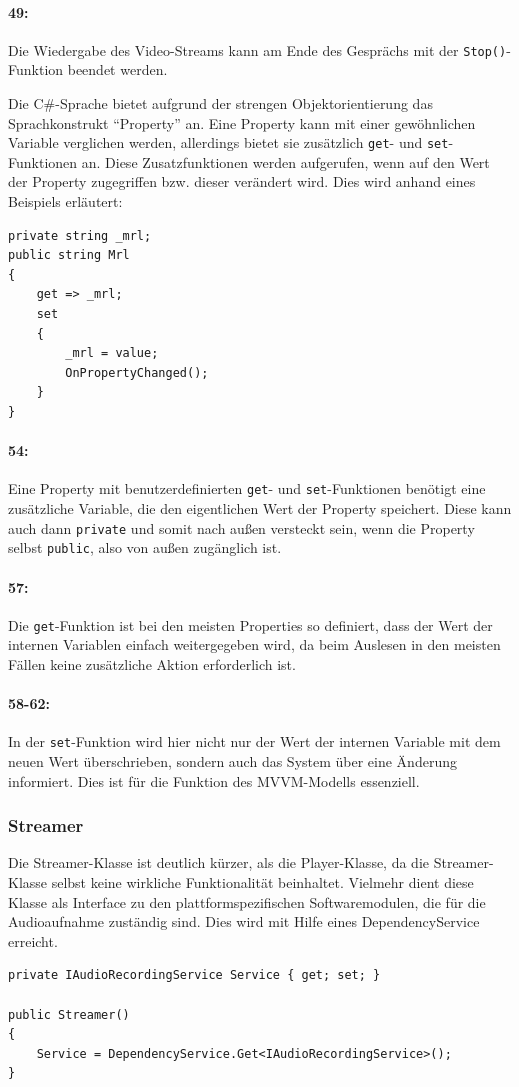 \paragraph{49:} Die Wiedergabe des Video-Streams kann am Ende des Gesprächs mit der \texttt{Stop()}-Funktion beendet werden.

Die C\#-Sprache bietet aufgrund der strengen Objektorientierung das Sprachkonstrukt \enquote{Property} an.
Eine Property kann mit einer gewöhnlichen Variable verglichen werden, allerdings bietet sie zusätzlich \texttt{get}- und \texttt{set}-Funktionen an.
Diese Zusatzfunktionen werden aufgerufen, wenn auf den Wert der Property zugegriffen bzw. dieser verändert wird.
Dies wird anhand eines Beispiels erläutert:
\begin{verbatim}
private string _mrl;
public string Mrl
{
    get => _mrl;
    set
    {
        _mrl = value;
        OnPropertyChanged();
    }
}
\end{verbatim}
\paragraph{54:} Eine Property mit benutzerdefinierten \texttt{get}- und \texttt{set}-Funktionen benötigt eine zusätzliche Variable, die den eigentlichen Wert der Property speichert.
Diese kann auch dann \texttt{private} und somit nach außen versteckt sein, wenn die Property selbst \texttt{public}, also von außen zugänglich ist.
\paragraph{57:} Die \texttt{get}-Funktion ist bei den meisten Properties so definiert, dass der Wert der internen Variablen einfach weitergegeben wird, da beim Auslesen in den meisten Fällen keine zusätzliche Aktion erforderlich ist.
\paragraph{58-62:} In der \texttt{set}-Funktion wird hier nicht nur der Wert der internen Variable mit dem neuen Wert überschrieben, sondern auch das System über eine Änderung informiert.
Dies ist für die Funktion des MVVM-Modells essenziell.
\subsubsection{Streamer}
Die Streamer-Klasse ist deutlich kürzer, als die Player-Klasse, da die Streamer-Klasse selbst keine wirkliche Funktionalität beinhaltet.
Vielmehr dient diese Klasse als Interface zu den plattformspezifischen Softwaremodulen, die für die Audioaufnahme zuständig sind.
Dies wird mit Hilfe eines DependencyService erreicht.
\begin{verbatim}
private IAudioRecordingService Service { get; set; }

public Streamer()
{
    Service = DependencyService.Get<IAudioRecordingService>();
}
\end{verbatim}
